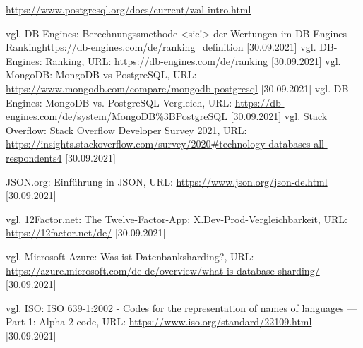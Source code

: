 \begin{thebibliography}{2}
         \url{https://www.postgresql.org/docs/current/wal-intro.html}



         vgl. DB Engines: Berechnungssmethode <sic!> der Wertungen im DB-Engines Ranking\url{https://db-engines.com/de/ranking_definition} [30.09.2021]
         vgl. DB-Engines: Ranking, URL: \url{https://db-engines.com/de/ranking} [30.09.2021]
         vgl. MongoDB: MongoDB vs PostgreSQL, URL: \url{https://www.mongodb.com/compare/mongodb-postgresql} [30.09.2021]
         vgl. DB-Engines: MongoDB vs. PostgreSQL Vergleich, URL: \url{https://db-engines.com/de/system/MongoDB%3BPostgreSQL} [30.09.2021]
         vgl. Stack Overflow: Stack Overflow Developer Survey 2021, URL: \url{https://insights.stackoverflow.com/survey/2020#technology-databases-all-respondents4} [30.09.2021]
        
         JSON.org: Einführung in JSON, URL: \url{https://www.json.org/json-de.html} [30.09.2021]

         vgl. 12Factor.net: The Twelve-Factor-App: X.Dev-Prod-Vergleichbarkeit, URL: \url{https://12factor.net/de/} [30.09.2021]

         vgl. Microsoft Azure: Was ist Datenbanksharding?, URL: \url{https://azure.microsoft.com/de-de/overview/what-is-database-sharding/} [30.09.2021]

         vgl. ISO: ISO 639-1:2002 - Codes for the representation of names of languages — Part 1: Alpha-2 code, URL: \url{https://www.iso.org/standard/22109.html} [30.09.2021]

\end{thebibliography}